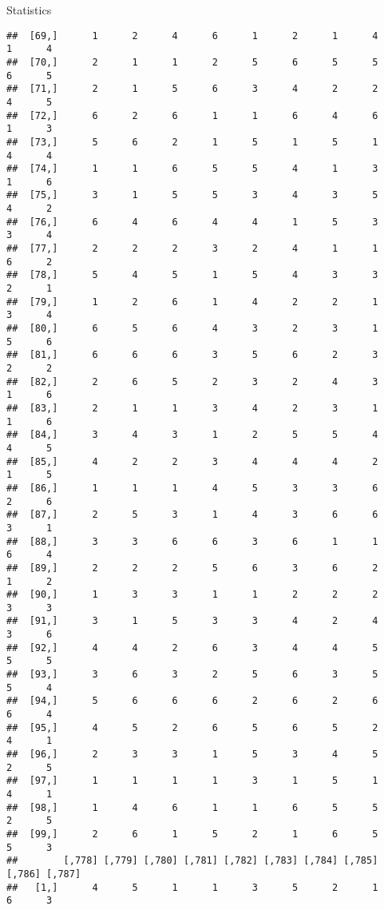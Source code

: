 \documentclass[
  ignorenonframetext,
]{beamer}
\begin{document}
\begin{frame}[fragile]{Statistics}
\begin{verbatim}
##  [69,]      1      2      4      6      1      2      1      4      1      4
##  [70,]      2      1      1      2      5      6      5      5      6      5
##  [71,]      2      1      5      6      3      4      2      2      4      5
##  [72,]      6      2      6      1      1      6      4      6      1      3
##  [73,]      5      6      2      1      5      1      5      1      4      4
##  [74,]      1      1      6      5      5      4      1      3      1      6
##  [75,]      3      1      5      5      3      4      3      5      4      2
##  [76,]      6      4      6      4      4      1      5      3      3      4
##  [77,]      2      2      2      3      2      4      1      1      6      2
##  [78,]      5      4      5      1      5      4      3      3      2      1
##  [79,]      1      2      6      1      4      2      2      1      3      4
##  [80,]      6      5      6      4      3      2      3      1      5      6
##  [81,]      6      6      6      3      5      6      2      3      2      2
##  [82,]      2      6      5      2      3      2      4      3      1      6
##  [83,]      2      1      1      3      4      2      3      1      1      6
##  [84,]      3      4      3      1      2      5      5      4      4      5
##  [85,]      4      2      2      3      4      4      4      2      1      5
##  [86,]      1      1      1      4      5      3      3      6      2      6
##  [87,]      2      5      3      1      4      3      6      6      3      1
##  [88,]      3      3      6      6      3      6      1      1      6      4
##  [89,]      2      2      2      5      6      3      6      2      1      2
##  [90,]      1      3      3      1      1      2      2      2      3      3
##  [91,]      3      1      5      3      3      4      2      4      3      6
##  [92,]      4      4      2      6      3      4      4      5      5      5
##  [93,]      3      6      3      2      5      6      3      5      5      4
##  [94,]      5      6      6      6      2      6      2      6      6      4
##  [95,]      4      5      2      6      5      6      5      2      4      1
##  [96,]      2      3      3      1      5      3      4      5      2      5
##  [97,]      1      1      1      1      3      1      5      1      4      1
##  [98,]      1      4      6      1      1      6      5      5      2      5
##  [99,]      2      6      1      5      2      1      6      5      5      3
##        [,778] [,779] [,780] [,781] [,782] [,783] [,784] [,785] [,786] [,787]
##   [1,]      4      5      1      1      3      5      2      1      6      3

\end{verbatim}
\end{frame}
\end{document}
